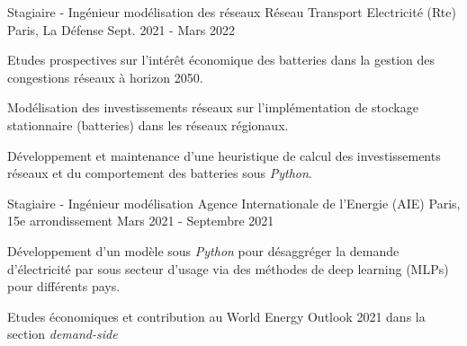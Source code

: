 \begin{cventries}
  \cventry
    {Stagiaire - Ingénieur modélisation des réseaux} %
    {Réseau Transport Electricité (Rte)} %
    {Paris, La Défense} %
    {Sept. 2021 - Mars 2022} %
    {
      \begin{cvitems} %
        \item {Etudes prospectives sur l'intérêt économique des batteries dans la gestion des congestions réseaux à horizon 2050.}
        \item {Modélisation des investissements réseaux sur l'implémentation de stockage stationnaire (batteries) dans les réseaux régionaux.}
        \item {Développement et maintenance d'une heuristique de calcul des investissements réseaux et du comportement des batteries sous \textit{Python}.} 
      \end{cvitems}
    }

  \cventry
    {Stagiaire - Ingénieur modélisation} %
    {Agence Internationale de l'Energie (AIE)} %
    {Paris, 15e arrondissement} %
    {Mars 2021 - Septembre 2021} %
    {
      \begin{cvitems} %
        \item {Développement d'un modèle sous \textit{Python} pour désaggréger la demande d'électricité par sous secteur d'usage via des méthodes de deep learning (MLPs) pour différents pays. }
        \item {Etudes économiques et contribution au World Energy Outlook 2021 dans la section \textit{demand-side}}
      \end{cvitems}
    }
    

\end{cventries}

